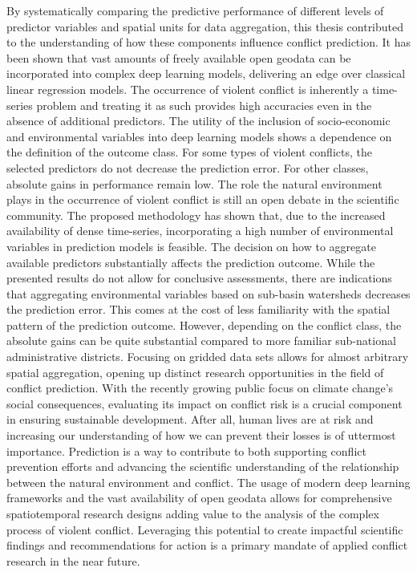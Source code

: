 \documentclass[a4paper,11pt]{article}
\begin{document}
By systematically comparing the predictive performance of different levels
of predictor variables and spatial units for data aggregation, this thesis
contributed to the understanding of how these components influence conflict prediction.
It has been shown that vast amounts of freely available open geodata can be incorporated
into complex deep learning models, delivering an edge over classical linear
regression models. The occurrence of violent conflict is inherently a time-series
problem and treating it as such provides high accuracies even in the absence of
additional predictors. The utility of the inclusion of socio-economic and
environmental variables into deep learning models shows a dependence on the
definition of the outcome class. For some types of violent conflicts, the selected
predictors do not decrease the prediction error. For other classes, absolute
gains in performance remain low. The role the natural environment plays in the
occurrence of violent conflict is still an open debate in the scientific community.
The proposed methodology has shown that, due to the increased availability of dense
time-series, incorporating a high number of environmental variables in prediction
models is feasible. The decision on how to aggregate available predictors substantially
affects the prediction outcome. While the presented results do not allow for
conclusive assessments, there are indications that aggregating environmental
variables based on sub-basin watersheds decreases the prediction error.
This comes at the cost of less familiarity with the spatial pattern of the
prediction outcome. However, depending on the conflict class, the absolute gains
can be quite substantial compared to more familiar sub-national administrative
districts. Focusing on gridded data sets allows for almost arbitrary spatial
aggregation, opening up distinct research opportunities in the field of conflict
prediction. With the recently growing public focus on climate change's social
consequences, evaluating its impact on conflict risk is a crucial component in
ensuring sustainable development. After all, human lives are at risk and increasing
our understanding of how we can prevent their losses is of uttermost importance.
Prediction is a way to contribute to both supporting conflict prevention efforts
and advancing the scientific understanding of the relationship between the natural
environment and conflict. The usage of modern deep learning frameworks and the
vast availability of open geodata allows for comprehensive spatiotemporal
research designs adding value to the analysis of the complex process of violent conflict.
Leveraging this potential to create impactful scientific findings and recommendations
for action is a primary mandate of applied conflict research in the near future.
\end{document}
